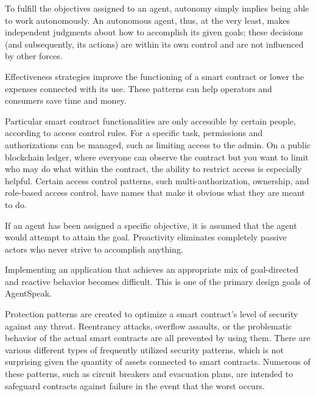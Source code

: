 \begin{itemize}

    To fulfill the objectives assigned to an agent, autonomy simply implies being able to work autonomously. An autonomous agent, thus, at the very least, makes independent judgments about how to accomplish its given goals; these decisions (and subsequently, its actions) are within its own control and are not influenced by other forces.
    
    Effectiveness strategies improve the functioning of a smart contract or lower the expenses connected with its use. These patterns can help operators and consumers save time and money.
    
    Particular smart contract functionalities are only accessible by certain people, according to access control rules. For a specific task, permissions and authorizations can be managed, such as limiting access to the admin. On a public blockchain ledger, where everyone can observe the contract but you want to limit who may do what within the contract, the ability to restrict access is especially helpful. Certain access control patterns, such multi-authorization, ownership, and role-based access control, have names that make it obvious what they are meant to do.
    
    If an agent has been assigned a specific objective, it is assumed that the agent would attempt to attain the goal. Proactivity eliminates completely passive actors who never strive to accomplish anything.

    Implementing an application that achieves an appropriate mix of goal-directed and reactive behavior becomes difficult. This is one of the primary design goals of AgentSpeak.
    
    Protection patterns are created to optimize a smart contract's level of security against any threat. Reentrancy attacks, overflow assaults, or the problematic behavior of the actual smart contracts are all prevented by using them. There are various different types of frequently utilized security patterns, which is not surprising given the quantity of assets connected to smart contracts. Numerous of these patterns, such as circuit breakers and evacuation plans, are intended to safeguard contracts against failure in the event that the worst occurs.
\end{itemize}

